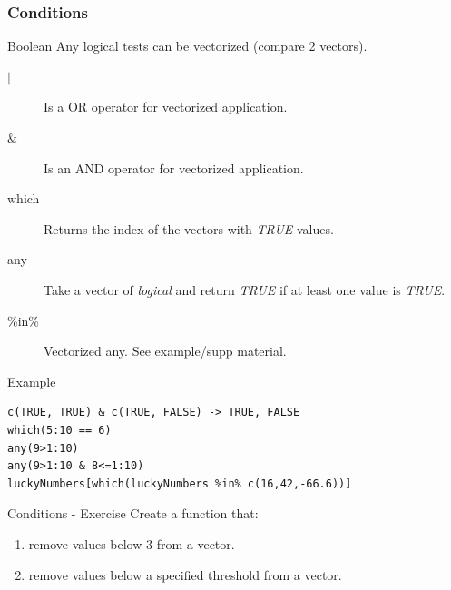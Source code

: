 \documentclass[10pt]{beamer}
\newenvironment{xframe}[2][]
  {\begin{frame}[fragile,environment=xframe,#1]
  \frametitle{#2}}
  {\end{frame}}
\begin{document}
\begin{xframe}{Conditions}
  \begin{block}{Boolean}
  Any logical tests can be vectorized (compare 2 {\sf vector}s).
    \begin{description}
       \item[$\mid$] Is a OR operator for vectorized application.
    \item[\&] Is an AND operator for vectorized application.
    \item[which] Returns the index of the {\sf vector}s with {\it TRUE} values.
    \item[any] Take a {\sf vector} of {\it logical} and return {\it TRUE} if at least one value is {\it TRUE}.
    \item[\%in\%] Vectorized any. See example/supp material.
    \end{description}
  \end{block}
  \begin{exampleblock}{Example}
\begin{verbatim}
c(TRUE, TRUE) & c(TRUE, FALSE) -> TRUE, FALSE
which(5:10 == 6)
any(9>1:10)
any(9>1:10 & 8<=1:10)
luckyNumbers[which(luckyNumbers %in% c(16,42,-66.6))]
\end{verbatim}  
  \end{exampleblock}
\end{xframe}

\begin{frame}{Conditions - Exercise}
  Create a function that: 
  \begin{enumerate}
  \item remove values below $3$ from a {\sf vector}.
  \item  remove values below a specified threshold from a {\sf vector}.
  \end{enumerate}
\end{frame}


\end{document}
